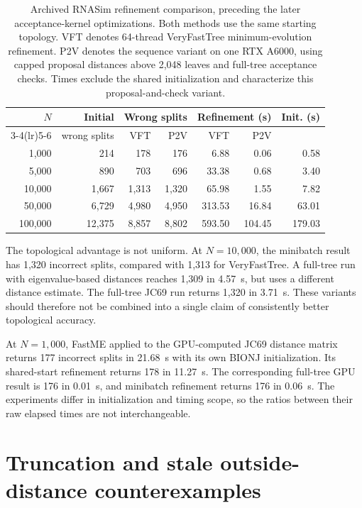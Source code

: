 \begin{table}[tb]
\centering
\caption{Archived RNASim refinement comparison, preceding the later acceptance-kernel optimizations. Both methods use the same starting topology. VFT denotes 64-thread VeryFastTree minimum-evolution refinement. P2V denotes the sequence variant on one RTX A6000, using capped proposal distances above 2,048 leaves and full-tree acceptance checks. Times exclude the shared initialization and characterize this proposal-and-check variant.}
\label{tab:rnasim_summary}
\small
\begin{tabular}{@{}rrrrrrr@{}}
\toprule
$N$ & Initial & \multicolumn{2}{c}{Wrong splits} & \multicolumn{2}{c}{Refinement (s)} & Init. (s)\\
\cmidrule(lr){3-4}\cmidrule(lr){5-6}
 & wrong splits & VFT & P2V & VFT & P2V & \\
\midrule
1,000 & 214 & 178 & 176 & 6.88 & 0.06 & 0.58\\
5,000 & 890 & 703 & 696 & 33.38 & 0.68 & 3.40\\
10,000 & 1,667 & 1,313 & 1,320 & 65.98 & 1.55 & 7.82\\
50,000 & 6,729 & 4,980 & 4,950 & 313.53 & 16.84 & 63.01\\
100,000 & 12,375 & 8,857 & 8,802 & 593.50 & 104.45 & 179.03\\
\bottomrule
\end{tabular}
\end{table}

The topological advantage is not uniform.
At $N=10{,}000$, the minibatch result has 1,320 incorrect splits, compared with 1,313 for VeryFastTree.
A full-tree run with eigenvalue-based distances reaches 1,309 in 4.57~s, but uses a different distance estimate.
The full-tree JC69 run returns 1,320 in 3.71~s.
These variants should therefore not be combined into a single claim of consistently better topological accuracy.

At $N=1{,}000$, FastME applied to the GPU-computed JC69 distance matrix returns 177 incorrect splits in 21.68~s with its own BIONJ initialization.
Its shared-start refinement returns 178 in 11.27~s.
The corresponding full-tree GPU result is 176 in 0.01~s, and minibatch refinement returns 176 in 0.06~s.
The experiments differ in initialization and timing scope, so the ratios between their raw elapsed times are not interchangeable.


\section{Truncation and stale outside-distance counterexamples}
\label{sec:counterexamples}

